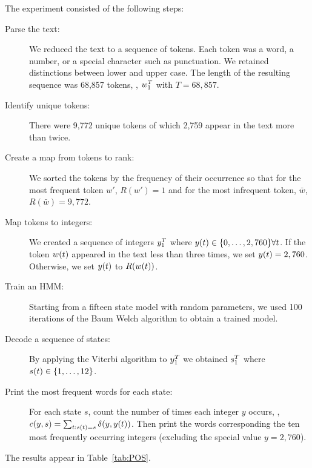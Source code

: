 The experiment consisted of the following steps:
\begin{description}
\item[Parse the text:] We reduced the text to a sequence of tokens.
  Each token was a word, a number, or a special character such as
  punctuation.  We retained distinctions between lower and upper case.
  The length of the resulting sequence was 68,857 tokens, \ie,
  $w_{1}^{T}$ with $T=68,857$.
\item[Identify unique tokens:] There were 9,772 unique tokens of which
  2,759 appear in the text more than twice.
\item[Create a map from tokens to rank:] We sorted the tokens by the
  frequency of their occurrence so that for the most frequent token
  $w'$, $R(w')=1$ and for the most infrequent token, $\bar w$, $R(\bar
  w)=9,772$.
\item[Map tokens to integers:] We created a sequence of integers
  $y_{1}^{T}$ where ${y}{(t)} \in \{0,\ldots,2,760\} \forall
  t$.  If the token ${w}{(t)}$ appeared in the text less than three
  times, we set ${y}{(t)}=2,760$.  Otherwise, we set  ${y}{(t)}$ to
  $R({w}{(t)})$.
\item[Train an HMM:] Starting from a fifteen state model with random
  parameters, we used 100 iterations of the Baum Welch algorithm to
  obtain a trained model.
\item[Decode a sequence of states:] By applying the Viterbi algorithm
  to $y_{1}^{T}$ we obtained $s_{1}^{T}$ where ${s}{(t)}\in
  \{1,\ldots,12\}$.
\item[Print the most frequent words for each state:] For each state
  $s$, count the number of times each integer $y$ occurs, \ie, $c(y,s)
  = \sum_{t:{s}{(t)}=s} \delta(y,{y}{(t)})$.  Then print the words
  corresponding the ten most frequently occurring integers (excluding
  the special value $y=2,760$).
\end{description}
The results appear in Table~\ref{tab:POS}.

